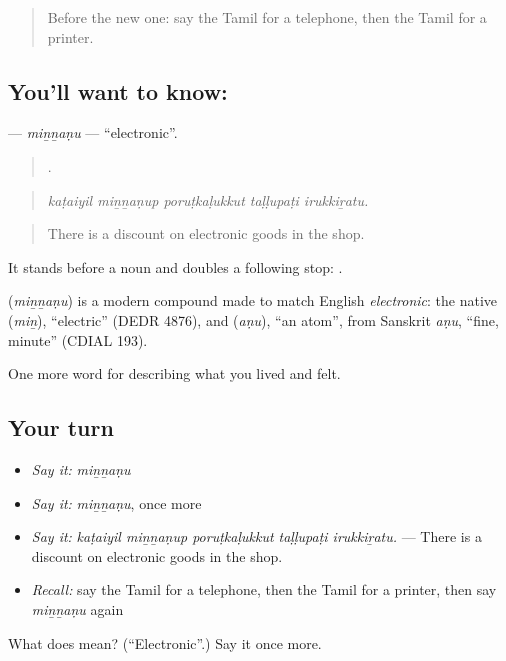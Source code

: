 \label{lesson:TA-C519-minnanu}



\begin{quote}
Before the new one: say the Tamil for a telephone, then the Tamil for a printer.
\end{quote}

\subsection*{You'll want to know: }
\textbf{} — \emph{miṉṉaṇu} — \textquotedblleft{}electronic\textquotedblright{}.

\begin{quote}
    .
\end{quote}

\begin{quote}
\emph{kaṭaiyil miṉṉaṇup poruṭkaḷukkut taḷḷupaṭi irukkiṟatu.}
\end{quote}

\begin{quote}
There is a discount on electronic goods in the shop.
\end{quote}

It stands before a noun and doubles a following stop:  .

\begin{cousinweb}
\textbf{} (\emph{miṉṉaṇu}) is a modern compound made to match English \emph{electronic}: the native  (\emph{miṉ}), \textquotedblleft{}electric\textquotedblright{} (DEDR 4876), and  (\emph{aṇu}), \textquotedblleft{}an atom\textquotedblright{}, from Sanskrit \emph{aṇu}, \textquotedblleft{}fine, minute\textquotedblright{} (CDIAL 193).
\end{cousinweb}

\begin{grammarlens}[title={What you've built}]
One more word for describing what you lived and felt.
\end{grammarlens}

\subsection*{Your turn}
\begin{itemize}
\raggedright
  \item \emph{Say it:} \emph{miṉṉaṇu}
  \item \emph{Say it:} \emph{miṉṉaṇu}, once more
  \item \emph{Say it:} \emph{kaṭaiyil miṉṉaṇup poruṭkaḷukkut taḷḷupaṭi irukkiṟatu.} — There is a discount on electronic goods in the shop.
  \item \emph{Recall:} say the Tamil for a telephone, then the Tamil for a printer, then say \emph{miṉṉaṇu} again
\end{itemize}

\begin{tcolorbox}[breakable,colback=teal!4,colframe=teal!35!black,title={Before you move on}]
What does  mean? (\textquotedblleft{}Electronic\textquotedblright{}.) Say it once more.
\end{tcolorbox}
